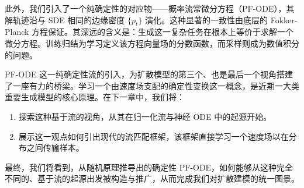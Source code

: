 此外，我们引入了一个纯确定性的对应物——概率流常微分方程（PF-ODE），其解轨迹沿与 SDE 相同的边缘密度 $\{p_{t}\}$ 演化。这种显著的一致性由底层的 Fokker-Planck 方程保证。其深远的含义是：生成这一复杂任务在根本上等价于求解一个微分方程。训练归结为学习定义该方程向量场的分数函数，而采样则成为数值积分的问题。

PF-ODE 这一纯确定性流的引入，为扩散模型的第三个、也是最后一个视角搭建了一座有力的桥梁。学习一个由速度场支配的确定性变换这一概念，是近期一大类重要生成模型的核心原理。在下一章中，我们将：
\begin{enumerate}
    \item 探索这种基于流的视角，从其在归一化流与神经 ODE 中的起源开始。
    \item 展示这一观点如何引出现代的流匹配框架，该框架直接学习一个速度场以在分布之间传输样本。
\end{enumerate}

最终，我们将看到，从随机原理推导出的确定性 PF-ODE，如何能够从这种完全不同的、基于流的起源出发被构造与推广，从而完成我们对扩散建模的统一图景。











